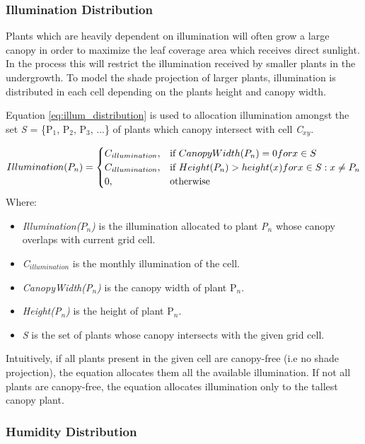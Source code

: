 \subsubsection{Illumination Distribution}

Plants which are heavily dependent on illumination will often grow a large canopy in order to maximize the leaf coverage area which receives direct sunlight. In the process this will restrict the illumination received by smaller plants in the undergrowth. To model the shade projection of larger plants, illumination is distributed in each cell depending on the plants height and canopy width. 

Equation \ref{eq:illum_distribution} is used to allocation illumination amongst the set \textit{S} = \{P$_{1}$, P$_{2}$, P$_{3}$, ...\} of plants which canopy intersect with cell \textit{C$_{xy}$}.

\begin{equation}
\centering
Illumination(P_{n}) = 
\begin{cases}
	C_{illumination}, & \text{if } CanopyWidth(P_{n}) = 0 for x \in S \\
	C_{illumination}, & \text{if } Height(P_{n}) > height(x) for x \in S : x \neq P_{n} \\
    0,              & \text{otherwise}
\end{cases}
\label{eq:illum_distribution}
\end{equation}
Where:
\begin{itemize}
\item \textit{Illumination($P_{n}$)} is the illumination allocated to plant \textit{P$_{n}$} whose canopy overlaps with current grid cell.
\item \textit{C$_{illumination}$} is the monthly illumination of the cell.
\item \textit{CanopyWidth(P$_{n}$)} is the canopy width of plant P$_{n}$.
\item \textit{Height(P$_{n}$)} is the height of plant P$_{n}$.
\item \textit{S} is the set of plants whose canopy intersects with the given grid cell.
\end{itemize}

Intuitively, if all plants present in the given cell are canopy-free (i.e no shade projection), the equation allocates them all the available illumination. If not all plants are canopy-free, the equation allocates illumination only to the tallest canopy plant.

\subsubsection{Humidity Distribution}

